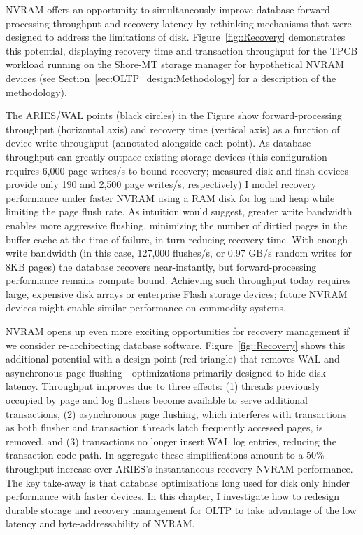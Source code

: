 NVRAM offers an opportunity to simultaneously improve database forward-processing throughput and recovery latency by rethinking mechanisms that were designed to address the limitations of disk.
Figure~\ref{fig::Recovery} demonstrates this potential, displaying recovery time and transaction throughput for the TPCB workload running on the Shore-MT storage manager \cite{JohnsonPandis09} for hypothetical NVRAM devices (see Section~\ref{sec:OLTP_design:Methodology} for a description of the methodology).



The ARIES/WAL points (black circles) in the Figure show forward-processing throughput (horizontal axis) and recovery time (vertical axis) as a function of device write throughput (annotated alongside each point).
As database throughput can greatly outpace existing storage devices (this configuration requires 6,000 page writes/s to bound recovery; measured disk and flash devices provide only 190 and 2,500 page writes/s, respectively) I model recovery performance under faster NVRAM using a RAM disk for log and heap while limiting the page flush rate.
As intuition would suggest, greater write bandwidth enables more aggressive flushing, minimizing the number of dirtied pages in the buffer cache at the time of failure, in turn reducing recovery time.
With enough write bandwidth (in this case, 127,000 flushes/s, or 0.97 GB/s random writes for 8KB pages) the database recovers near-instantly, but forward-processing performance remains compute bound.
Achieving such throughput today requires large, expensive disk arrays or enterprise Flash storage devices; future NVRAM devices might enable similar performance on commodity systems.

NVRAM opens up even more exciting opportunities for recovery management if we consider re-architecting database software.
Figure~\ref{fig::Recovery} shows this additional potential with a design point (red triangle) that removes WAL and asynchronous page flushing---optimizations primarily designed to hide disk latency.
Throughput improves due to three effects: (1) threads previously occupied by page and log flushers become available to serve additional transactions, (2) asynchronous page flushing, which interferes with transactions as both flusher and transaction threads latch frequently accessed pages, is removed, and (3) transactions no longer insert WAL log entries, reducing the transaction code path.
In aggregate these simplifications amount to a 50\% throughput increase over ARIES's instantaneous-recovery NVRAM performance.
The key take-away is that database optimizations long used for disk only hinder performance with faster devices.
In this chapter, I investigate how to redesign durable storage and recovery management for OLTP to take advantage of the low latency and byte-addressability of NVRAM.

